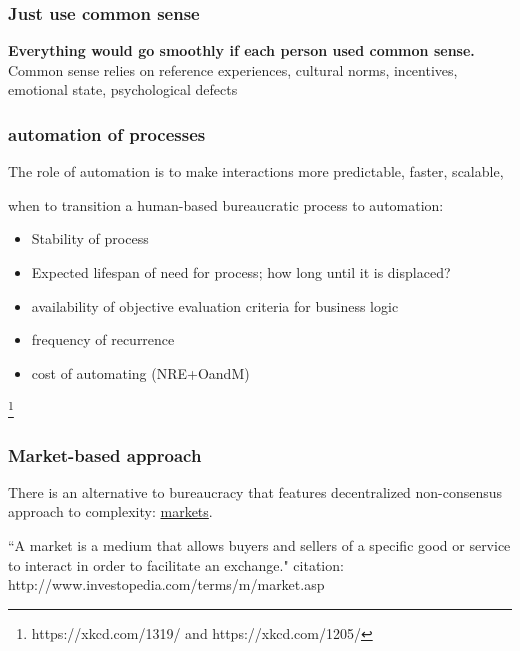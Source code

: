 \subsubsection{Just use common sense}
\textbf{Everything would go smoothly if each person used common sense.}\\
Common sense relies on reference experiences, cultural norms, incentives, emotional state, psychological defects


\subsubsection{automation of processes}

The role of automation is to make interactions more predictable, faster, scalable,

when to transition a human-based bureaucratic process to automation:
\begin{itemize}
    \item Stability of process
    \item Expected lifespan of need for process; how long until it is displaced?
\item availability of objective evaluation criteria for business logic
\item frequency of recurrence
\item cost of automating (NRE+OandM)
\end{itemize}

\footnote{https://xkcd.com/1319/ and https://xkcd.com/1205/}

\subsubsection{Market-based approach}

There is an alternative to bureaucracy that features decentralized non-consensus approach to complexity: \href{https://en.wikipedia.org/wiki/Market_(economics)}{markets}.

``A market is a medium that allows buyers and sellers of a specific good or service to interact in order to facilitate an exchange."
citation: http://www.investopedia.com/terms/m/market.asp


